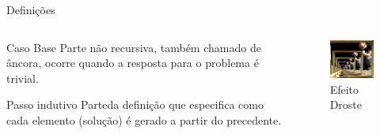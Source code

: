 \documentclass[10pt, handout]{beamer}
\newcommand{\duascolunas}[2]{
  \begin{columns}[t]
    \begin{column}{6cm}
      #1
    \end{column}
    \begin{column}{6cm}
      #2
    \end{column}
  \end{columns}
}
\begin{document}
\begin{frame}{Definições}
  \duascolunas{\begin{block}{Caso Base}
      Parte não recursiva, também chamado de âncora, ocorre quando a resposta para o problema é trivial.
    \end{block}
    \vfill
    \begin{block}{Passo indutivo}
      Parteda definição que especifica como cada elemento (solução) é gerado a partir do precedente.
    \end{block}}{
    \begin{figure}[h]
      \begin{center}
        \includegraphics[width=5cm]{fig/droste.jpeg}
        \caption{Efeito Droste}
      \end{center}
    \end{figure}
  }
\end{frame}
\end{document}
